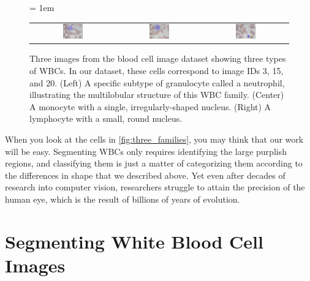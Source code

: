 \begin{figure}[h]
\centering
\tabcolsep = 1em
\mySfFamily
\begin{tabular}{c c c}
\includegraphics[width = 0.25\textwidth]{../images/neutrophil.png} & \includegraphics[width = 0.25\textwidth]{../images/monocyte.png} & \includegraphics[width = 0.25\textwidth]{../images/lymphocyte.png}
\end{tabular}
\caption{Three images from the blood cell image dataset showing three types of WBCs. In our dataset, these cells correspond to image IDs 3, 15, and 20. (Left) A specific subtype of granulocyte called a neutrophil, illustrating the multilobular structure of this WBC family. (Center) A monocyte with a single, irregularly-shaped nucleus. (Right) A lymphocyte with a small, round nucleus.}
\label{fig:three_families}
\end{figure}

When you look at the cells in \autoref{fig:three_families}, you may think that our work will be easy. Segmenting WBCs only requires identifying the large purplish regions, and classifying them is just a matter of categorizing them according to the differences in shape that we described above. Yet even after decades of research into computer vision, researchers struggle to attain the precision of the human eye, which is the result of billions of years of evolution.\\

\FloatBarrier
{}

\section{Segmenting White Blood Cell Images}
\label{sec:segmenting_white_blood_cell_images}
